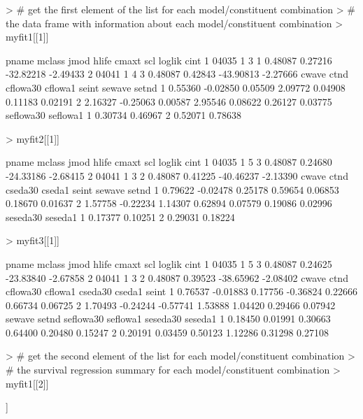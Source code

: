 \documentclass[11pt]{article}
\begin{document}
\begin{Schunk}
\begin{Sinput}
> # get the first element of the list for each model/constituent combination
> # the data frame with information about each model/constituent combination
> myfit1[[1]]
\end{Sinput}
\begin{Soutput}
  pname mclass jmod hlife   cmaxt     scl    loglik     cint
1 04035      1    3     1 0.48087 0.27216 -32.82218 -2.49433
2 04041      1    4     3 0.48087 0.42843 -43.90813 -2.27666
    cwave     ctnd cflowa30 cflowa1   seint  sewave   setnd
1 0.55360 -0.02850  0.05509 2.09772 0.04908 0.11183 0.02191
2 2.16327 -0.25063  0.00587 2.95546 0.08622 0.26127 0.03775
  seflowa30 seflowa1
1   0.30734  0.46967
2   0.52071  0.78638
\end{Soutput}
\begin{Sinput}
> myfit2[[1]]
\end{Sinput}
\begin{Soutput}
  pname mclass jmod hlife   cmaxt     scl    loglik     cint
1 04035      1    5     3 0.48087 0.24680 -24.33186 -2.68415
2 04041      1    3     2 0.48087 0.41225 -40.46237 -2.13390
    cwave     ctnd cseda30  cseda1   seint  sewave   setnd
1 0.79622 -0.02478 0.25178 0.59654 0.06853 0.18670 0.01637
2 1.57758 -0.22234 1.14307 0.62894 0.07579 0.19086 0.02996
  seseda30 seseda1
1  0.17377 0.10251
2  0.29031 0.18224
\end{Soutput}
\begin{Sinput}
> myfit3[[1]]
\end{Sinput}
\begin{Soutput}
  pname mclass jmod hlife   cmaxt     scl    loglik     cint
1 04035      1    5     3 0.48087 0.24625 -23.83840 -2.67858
2 04041      1    3     2 0.48087 0.39523 -38.65962 -2.08402
    cwave     ctnd cflowa30  cflowa1 cseda30  cseda1   seint
1 0.76537 -0.01883  0.17756 -0.36824 0.22666 0.66734 0.06725
2 1.70493 -0.24244 -0.57741  1.53888 1.04420 0.29466 0.07942
   sewave   setnd seflowa30 seflowa1 seseda30 seseda1
1 0.18450 0.01991   0.30663  0.64400  0.20480 0.15247
2 0.20191 0.03459   0.50123  1.12286  0.31298 0.27108
\end{Soutput}
\begin{Sinput}
> # get the second element of the list for each model/constituent combination
> # the survival regression summary for each model/constituent combination
> myfit1[[2]]
\end{Sinput}
\begin{Soutput}
[[1]]


\end{Soutput}
\end{Schunk}
\end{document}
